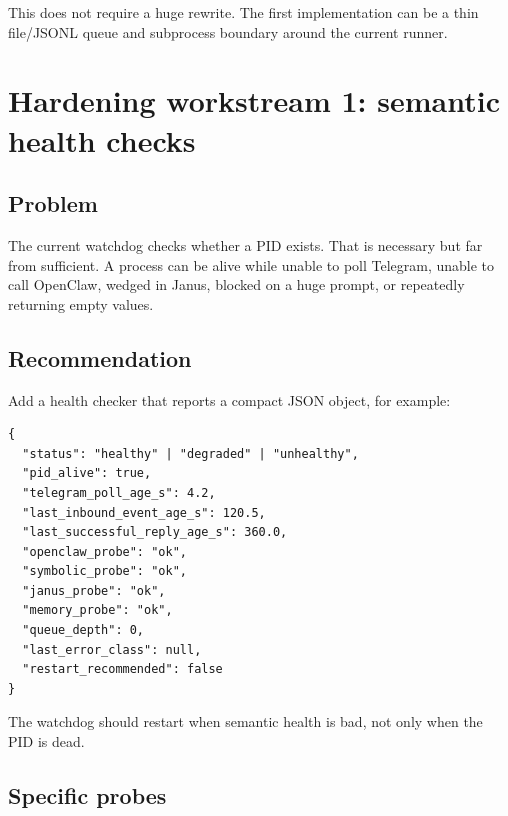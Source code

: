 \documentclass[11pt]{article}
\begin{document}
This does not require a huge rewrite. The first implementation can be a thin file/JSONL queue and subprocess boundary around the current runner.

\section{Hardening workstream 1: semantic health checks}

\subsection{Problem}

The current watchdog checks whether a PID exists. That is necessary but far from sufficient. A process can be alive while unable to poll Telegram, unable to call OpenClaw, wedged in Janus, blocked on a huge prompt, or repeatedly returning empty values.

\subsection{Recommendation}

Add a health checker that reports a compact JSON object, for example:

\begin{Verbatim}[fontsize=\small]
{
  "status": "healthy" | "degraded" | "unhealthy",
  "pid_alive": true,
  "telegram_poll_age_s": 4.2,
  "last_inbound_event_age_s": 120.5,
  "last_successful_reply_age_s": 360.0,
  "openclaw_probe": "ok",
  "symbolic_probe": "ok",
  "janus_probe": "ok",
  "memory_probe": "ok",
  "queue_depth": 0,
  "last_error_class": null,
  "restart_recommended": false
}
\end{Verbatim}

The watchdog should restart when semantic health is bad, not only when the PID is dead.

\subsection{Specific probes}
\end{document}
